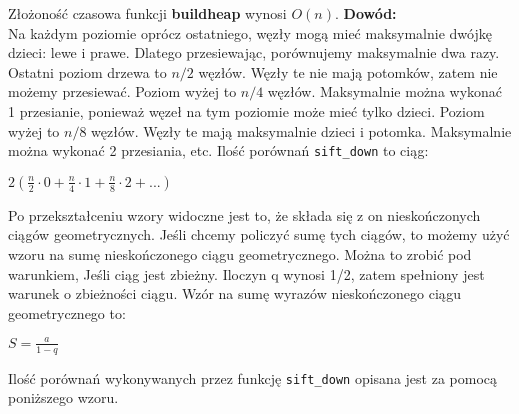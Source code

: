 \documentclass{article}
\begin{document}
    \begin{flushleft}
        Złożoność czasowa funkcji \textbf{buildheap} wynosi $O(n)$. \textbf{Dowód:} \\
        \vspace{1mm}
        Na każdym poziomie oprócz ostatniego, węzły mogą mieć maksymalnie dwójkę dzieci: lewe i prawe. Dlatego
        przesiewając, porównujemy maksymalnie dwa razy. Ostatni poziom drzewa to $n/2$ węzłów. 
        Węzły te nie mają potomków, zatem nie możemy przesiewać. Poziom wyżej to $n/4$ węzłów. Maksymalnie można wykonać 
        1 przesianie, ponieważ węzeł na tym poziomie może mieć tylko dzieci. Poziom wyżej to $n/8$ węzłów. Węzły te
        mają maksymalnie dzieci i potomka. Maksymalnie można wykonać 2 przesiania, etc. Ilość porównań \verb+sift_down+ to ciąg:
    \end{flushleft}
        
    \begin{center}
        $2(\frac{n}{2} \cdot 0 + \frac{n}{4} \cdot 1 + \frac{n}{8} \cdot 2 + ...)$
    \end{center}
 
    \noindent Po przekształceniu wzory widoczne jest to, że składa się z on nieskończonych ciągów geometrycznych. Jeśli chcemy 
    policzyć sumę tych ciągów, to możemy użyć wzoru na sumę nieskończonego ciągu geometrycznego. Można to zrobić pod warunkiem, Jeśli
    ciąg jest zbieżny. Iloczyn q wynosi 1/2, zatem spełniony jest warunek o zbieżności ciągu. Wzór na sumę wyrazów
    nieskończonego ciągu geometrycznego to:
    
    \begin{center}
        $S = \frac{a}{1-q}$
    \end{center}    

    Ilość porównań wykonywanych przez funkcję \verb+sift_down+ opisana jest za pomocą poniższego wzoru.
\end{document}
